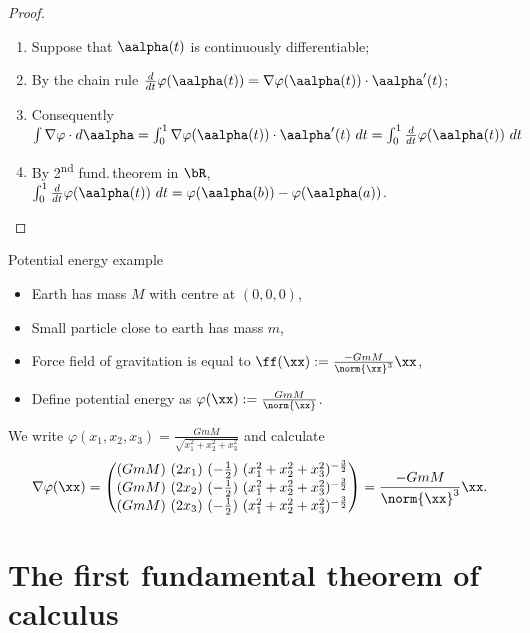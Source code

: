     \begin{proof}
        \begin{enumerate}
            \item Suppose that \(\aalpha(t)\) is continuously differentiable;
            \item By the chain rule \(\frac{d}{dt} \varphi(\aalpha(t)) = \nabla \varphi(\aalpha(t))\cdot \aalpha'(t)\);
            \item Consequently \(\int \nabla \varphi \cdot d\aalpha
                  = \int_0^1 \nabla \varphi(\aalpha(t)) \cdot \aalpha'(t)\ dt
                  = \int_0^1 \tfrac{d}{dt} \varphi(\aalpha(t)) \ dt \)
            \item By 2\textsuperscript{nd} fund.\,theorem in \(\bR\),
                  \(\int_0^1 \tfrac{d}{dt} \varphi(\aalpha(t)) \ dt = \varphi(\aalpha(b)) - \varphi(\aalpha(a))\).
        \end{enumerate}
    \end{proof}




    {Potential energy example}

    \begin{itemize}
        \item Earth has mass \(M\) with centre at \((0,0,0)\),
        \item Small particle close to earth has mass \(m\),
        \item Force field of gravitation is equal to
              \(\ff(\xx) := \frac{-GmM}{\norm{\xx}^3}\xx\),
        \item Define potential energy as
              \(\varphi(\xx):= \frac{GmM}{\norm{\xx}}\).
    \end{itemize}

    We write \(\varphi(x_1,x_2,x_3) = \frac{GmM}{\sqrt{x_1^2 + x_2^2 + x_3^2}}\)
    and calculate
    \[
        \nabla \varphi(\xx) =
        \begin{pmatrix}
            {(GmM) \ (2x_1)} \ {(-\frac{1}{2}) \ (x_1^2 + x_2^2 + x_3^2)^{-\frac{3}{2}}} \\
            {(GmM) \ (2x_2)} \ {(-\frac{1}{2}) \ (x_1^2 + x_2^2 + x_3^2)^{-\frac{3}{2}}} \\
            {(GmM) \ (2x_3)} \ {(-\frac{1}{2}) \ (x_1^2 + x_2^2 + x_3^2)^{-\frac{3}{2}}}
        \end{pmatrix}
        =   \frac{-GmM}{\norm{\xx}^3}\xx.
    \]




\section{The first fundamental theorem of calculus}



